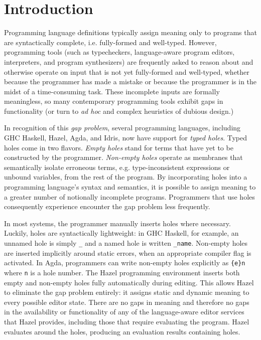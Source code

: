 \section{Introduction}
\label{sec:intro}

Programming language definitions typically assign meaning 
only to programs that are syntactically complete, i.e. fully-formed and well-typed.
However, programming tools (such as typecheckers, language-aware program editors, interpreters, and program synthesizers) 
are frequently asked to reason about and otherwise operate on input that is not yet fully-formed and well-typed,
whether because the programmer has made a mistake or because the programmer is in the midst of a time-consuming task. 
These incomplete inputs are formally meaningless, so many contemporary programming tools exhibit gaps in functionality (or turn to  
\emph{ad hoc} and complex heuristics of dubious design.)

In recognition of this \emph{gap problem}, several programming languages, 
including GHC Haskell, Hazel, Agda, and Idris, now 
have support for \emph{typed holes}. Typed holes come in two flavors. \emph{Empty holes} 
stand for terms that have yet to be constructed by the programmer. 
\emph{Non-empty holes} 
operate as membranes that semantically isolate erroneous terms, e.g. type-inconsistent
expressions or unbound variables, 
from the rest of the program.
By incorporating holes into a programming language's syntax and semantics, 
it is possible to assign meaning to a greater number of notionally incomplete programs.
Programmers that use holes consequently experience encounter the gap problem less frequently.

In most systems, the programmer manually inserts holes where necessary.
Luckily, holes are syntactically lightweight: in GHC Haskell, for example, an unnamed
hole is simply \verb|_| and a named hole is written \verb|_name|. 
Non-empty holes are inserted implicitly around static errors, when an appropriate compiler flag
is activated. In Agda, programmers can write 
non-empty holes explicitly as \verb|{e}n| where \lstinline{n} is a hole number.
The Hazel programming environment inserts both empty and non-empty holes fully automatically during editing. This allows Hazel to eliminate the gap problem entirely: it assigns static and dynamic meaning to every possible
editor state. There are no gaps in meaning and therefore no gaps in the availability or functionality of any of the 
language-aware editor services that Hazel provides, including those that require evaluating the program. Hazel evaluates around the holes, producing an evaluation results containing holes.

